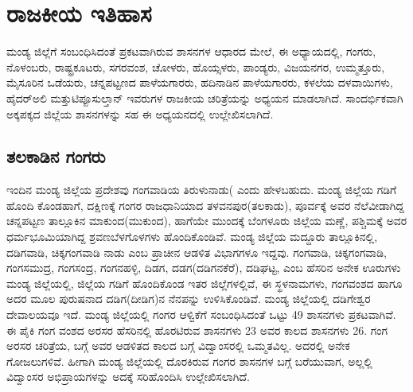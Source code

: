 
\chapter{ರಾಜಕೀಯ ಇತಿಹಾಸ}

ಮಂಡ್ಯ ಜಿಲ್ಲೆಗೆ ಸಂಬಂಧಿಸಿದಂತೆ ಪ್ರಕಟವಾಗಿರುವ ಶಾಸನಗಳ ಆಧಾರದ ಮೇಲೆ, ಈ ಅಧ್ಯಾಯದಲ್ಲಿ, ಗಂಗರು, ನೊಳಂಬರು, ರಾಷ್ಟ್ರಕೂಟರು, ಸಗರವಂಶ, ಚೋಳರು, ಹೊಯ್ಸಳರು, ಪಾಂಡ್ಯರು, ವಿಜಯನಗರ, ಉಮ್ಮತ್ತೂರು, ಮೈಸೂರಿನ ಒಡೆಯರು, ಚನ್ನಪಟ್ಟಣದ ಪಾಳೆಯಗಾರರು, ಹದಿನಾಡಿನ ಪಾಳೆಯಗಾರರು, ಕಳಲೆಯ ದಳವಾಯಿಗಳು, ಹೈದರ್​ಅಲಿ ಮತ್ತು\break ಟಿಪ್ಪೂಸುಲ್ತಾನ್​ ಇವರುಗಳ ರಾಜಕೀಯ ಚರಿತ್ರೆಯನ್ನು ಅಧ್ಯಯನ ಮಾಡಲಾಗಿದೆ. ಸಾಂದರ್ಭಿಕವಾಗಿ ಅಕ್ಕಪಕ್ಕದ ಜಿಲ್ಲೆಯ ಶಾಸನಗಳನ್ನು ಸಹ ಈ ಅಧ್ಯಯನದಲ್ಲಿ ಉಲ್ಲೇಖಿಸಲಾಗಿದೆ.

\section{ತಲಕಾಡಿನ ಗಂಗರು}

ಇಂದಿನ ಮಂಡ್ಯ ಜಿಲ್ಲೆಯ ಪ್ರದೇಶವು ಗಂಗವಾಡಿಯ ತಿರುಳುನಾಡು( ಎಂದು ಹೇಳಬಹುದು. ಮಂಡ್ಯ ಜಿಲ್ಲೆಯ ಗಡಿಗೆ ಹೊಂದಿ ಕೊಂಡಹಾಗೆ, ದಕ್ಷಿಣಕ್ಕೆ ಗಂಗರ ರಾಜಧಾನಿಯಾದ ತಳವನಪುರ(ತಲಕಾಡು), ಪೂರ್ವಕ್ಕೆ ಅವರ ನೆಲೆವೀಡಾಗಿದ್ದ ಚನ್ನಪಟ್ಟಣ ತಾಲ್ಲೂಕಿನ ಮಾಕುಂದ(ಮುಕುಂದ), ಹಾಗೆಯೇ ಮುಂದಕ್ಕೆ ಬೆಂಗಳೂರು ಜಿಲ್ಲೆಯ ಮಣ್ಣೆ, ಪಶ್ಚಿಮಕ್ಕೆ ಅವರ ಧರ್ಮಭೂಮಿಯಾಗಿದ್ದ ಶ್ರವಣಬೆಳಗೊಳಗಳು ಹೊಂದಿಕೊಂಡಿವೆ. ಮಂಡ್ಯ ಜಿಲ್ಲೆಯ ಮದ್ದೂರು ತಾಲ್ಲೂಕಿನಲ್ಲಿ, ದಡಿಗವಾಡಿ, ಚಿಕ್ಕಗಂಗವಾಡಿ ನಾಡು ಎಂಬ ಪ್ರಾಚೀನ ಆಡಳಿತ ವಿಭಾಗಗಳೂ ಇದ್ದವು. ಗಂಗವಾಡಿ, ಚಿಕ್ಕಗಂಗವಾಡಿ, ಗಂಗಸಮುದ್ರ, ಗಂಗಸಂದ್ರ, ಗಂಗನಹಳ್ಳಿ, ದಿಡಗ, ದಡಗ(ದಡಿಗನಕೆರೆ), ದಡಿಘಟ್ಟ, ಎಂಬ ಹೆಸರಿನ ಅನೇಕ ಊರುಗಳು ಮಂಡ್ಯ ಜಿಲ್ಲೆಯಲ್ಲಿ, ಜಿಲ್ಲೆಯ ಗಡಿಗೆ ಹೊಂದಿಕೊಂಡ ಇತರ ಜಿಲ್ಲೆಗಳಲ್ಲಿವೆ, ಈ ಸ್ಥಳನಾಮಗಳು, ಗಂಗವಂಶದ ಹಾಗೂ ಅದರ ಮೂಲ ಪುರುಷನಾದ ದಡಿಗ(ದೀಡಿಗ)ನ ನೆನಪನ್ನು ಉಳಿಸಿಕೊಂಡಿವೆ. ಮಂಡ್ಯ ಜಿಲ್ಲೆಯಲ್ಲಿ ದಡಿಗೇಶ್ವರ ದೇವಾಲಯವೂ ಇದೆ. ಮಂಡ್ಯ ಜಿಲ್ಲೆಯಲ್ಲಿ ಗಂಗರ ಆಳ್ವಿಕೆಗೆ ಸಂಬಂಧಿಸಿದಂತೆ ಒಟ್ಟು 49 ಶಾಸನಗಳು ಪ್ರಕಟವಾಗಿವೆ. ಈ ಪೈಕಿ ಗಂಗ ವಂಶದ ಅರಸರ ಹೆಸರಿನಲ್ಲಿ ಹೊರಟಿರುವ ಶಾಸನಗಳು 23 ಅವರ ಕಾಲದ ಶಾಸನಗಳು 26. ಗಂಗ ಅರಸರ ಚರಿತ್ರೆಯ, ಬಗ್ಗೆ ಅವರ ಆಡಳಿತದ ಕಾಲದ ಬಗ್ಗೆ ವಿದ್ವಾಂಸರಲ್ಲಿ ಒಮ್ಮತವಿಲ್ಲ. ಅದರಲ್ಲಿ ಅನೇಕ ಗೋಜಲುಗಳಿವೆ. ಹೀಗಾಗಿ ಮಂಡ್ಯ ಜಿಲ್ಲೆಯಲ್ಲಿ ದೊರಕಿರುವ ಗಂಗರ ಶಾಸನಗಳ ಬಗ್ಗೆ ಬರೆಯುವಾಗ, ಅಲ್ಲಲ್ಲಿ ವಿದ್ವಾಂಸರ ಅಭಿಪ್ರಾಯಗಳನ್ನು ಅದಕ್ಕೆ ಸರಿಹೊಂದಿಸಿ ಉಲ್ಲೇಖಿಸಲಾಗಿದೆ. 

